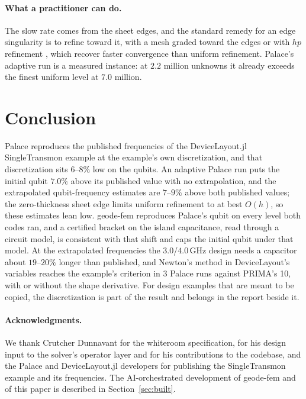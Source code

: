 \documentclass{anvil-paper}
\begin{document}
\paragraph{What a practitioner can do.}
The slow rate comes from the sheet edges, and the standard remedy for an
edge singularity is to refine toward it, with a mesh graded toward the
edges or with $hp$ refinement \citep{demkowicz2006computing}, which recover
faster convergence than uniform refinement. Palace's adaptive run is a
measured instance: at $2.2$ million unknowns it already exceeds the finest
uniform level at $7.0$ million.

\section{Conclusion}
\label{sec:conclusion}

Palace reproduces the published frequencies of the DeviceLayout.jl
SingleTransmon example at the example's own discretization, and that
discretization sits $6$--$8\%$ low on the qubits. An adaptive Palace run
puts the initial qubit $7.0\%$ above its published value with no
extrapolation, and the extrapolated qubit-frequency estimates are $7$--$9\%$
above both published values; the zero-thickness sheet edge limits uniform
refinement to at best $O(h)$, so these estimates lean low. geode-fem
reproduces Palace's qubit on every level both codes ran, and a certified
bracket on the island capacitance, read through a circuit model, is
consistent with that shift and caps the initial qubit under that model. At
the extrapolated frequencies the $3.0$/$4.0$\,GHz design needs a capacitor
about $19$--$20\%$ longer than published, and Newton's method in
DeviceLayout's variables reaches the example's criterion in 3 Palace runs
against PRIMA's 10, with or without the shape derivative. For design
examples that are
meant to be copied, the discretization is part of the result and belongs
in the report beside it.

\paragraph{Acknowledgments.}
We thank Crutcher Dunnavant for the whiteroom specification, for his
design input to the solver's operator layer and for his contributions to
the codebase, and the Palace and DeviceLayout.jl developers for publishing
the SingleTransmon example and its frequencies. The AI-orchestrated
development of geode-fem and of this paper is described in
Section~\ref{sec:built}.



\end{document}
